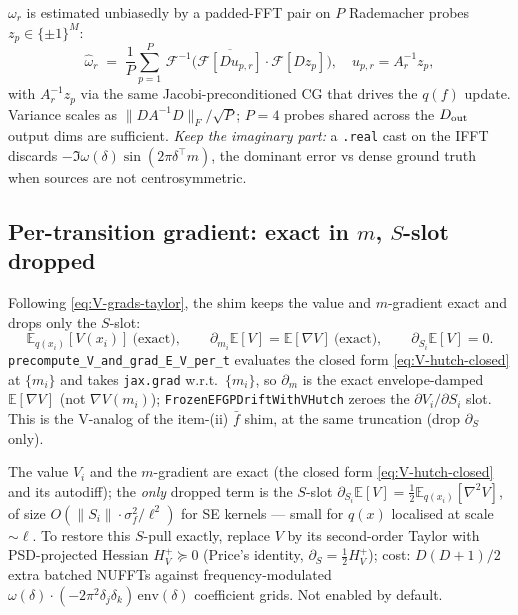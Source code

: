 \documentclass[11pt]{article}
\newcommand{\E}{\mathbb{E}}
\newcommand{\Eqx}{\mathbb{E}_{q(x_i)}}
\newcommand{\code}[1]{\texttt{\small #1}}
\begin{document}
$\omega_r$ is estimated unbiasedly by a padded-FFT pair on $P$ Rademacher
probes $z_p\!\in\!\{\pm 1\}^M$:
\begin{equation}
\hat\omega_r \;=\; \frac{1}{P}\sum_{p=1}^{P}\,
   \mathcal{F}^{-1}\!\bigl(\overline{\mathcal{F}[D u_{p,r}]}
   \cdot \mathcal{F}[D z_p]\bigr),\quad
u_{p,r} = A_r^{-1} z_p,
\label{eq:omega-hutch}
\end{equation}
with $A_r^{-1} z_p$ via the same Jacobi-preconditioned CG that drives
the $q(f)$ update. Variance scales as $\|D A^{-1} D\|_F/\sqrt{P}$;
$P\!=\!4$ probes shared across the $D_{\rm out}$ output dims are
sufficient. \emph{Keep the imaginary part:} a \code{.real} cast on the
IFFT discards $-\Im\omega(\delta)\sin(2\pi\delta^\top m)$, the dominant
error vs dense ground truth when sources are not centrosymmetric.

\subsection{Per-transition gradient: exact in $m$, $S$-slot dropped}

Following \eqref{eq:V-grads-taylor}, the shim keeps the value and
$m$-gradient exact and drops only the $S$-slot:
\begin{equation}
\E_{q(x_i)}[V(x_i)]\ \text{(exact)},
\qquad
\partial_{m_i}\E[V] = \E[\nabla V]\ \text{(exact)},
\qquad
\partial_{S_i}\E[V] = 0.
\end{equation}
\code{precompute\_V\_and\_grad\_E\_V\_per\_t} evaluates the closed form
\eqref{eq:V-hutch-closed} at $\{m_i\}$ and takes \code{jax.grad} w.r.t.\
$\{m_i\}$, so $\partial_m$ is the exact envelope-damped $\E[\nabla V]$
(not $\nabla V(m_i)$); \code{FrozenEFGPDriftWithVHutch} zeroes the
$\partial V_i/\partial S_i$ slot. This is the V-analog of the item-(ii)
$\bar f$ shim, at the same truncation (drop $\partial_S$ only).

The value $V_i$ and the $m$-gradient are exact (the closed form
\eqref{eq:V-hutch-closed} and its autodiff); the \emph{only} dropped term
is the $S$-slot $\partial_{S_i}\E[V]=\tfrac12\Eqx[\nabla^2 V]$, of size
$O(\|S_i\|\cdot\sigma_f^2/\ell^2)$ for SE kernels --- small for $q(x)$
localised at scale $\sim\ell$. To restore this $S$-pull exactly, replace
$V$ by its second-order Taylor with PSD-projected Hessian
$H_V^{+}\succeq 0$ (Price's identity, $\partial_S = \tfrac12 H_V^{+}$);
cost: $D(D{+}1)/2$ extra batched NUFFTs against frequency-modulated
$\omega(\delta)\cdot(-2\pi^2\delta_j\delta_k)\,\mathrm{env}(\delta)$
coefficient grids. Not enabled by default.
\end{document}
